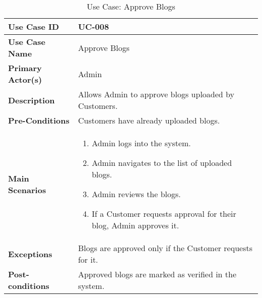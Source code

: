 \begin{table}[ht]
    \centering
    \begin{tabular}{|l|p{}|}
        \hline
        \textbf{Use Case ID} & UC-008 \\
        \hline
        \textbf{Use Case Name} & Approve Blogs \\
        \hline
        \textbf{Primary Actor(s)} & Admin \\
        \hline
        \textbf{Description} & Allows Admin to approve blogs uploaded by Customers. \\
        \hline
        \textbf{Pre-Conditions} & Customers have already uploaded blogs. \\
        \hline
        \textbf{Main Scenarios} & 
        \begin{enumerate}[label=\arabic*.,itemsep=0pt]
            \item Admin logs into the system.
            \item Admin navigates to the list of uploaded blogs.
            \item Admin reviews the blogs.
            \item If a Customer requests approval for their blog, Admin approves it.
        \end{enumerate} \\
        \hline
        \textbf{Exceptions} & Blogs are approved only if the Customer requests for it. \\
        \hline
        \textbf{Post-conditions} & Approved blogs are marked as verified in the system. \\
        \hline
    \end{tabular}
    \label{tab:use-case-approve-blogs}
    \caption{Use Case: Approve Blogs}
\end{table}


